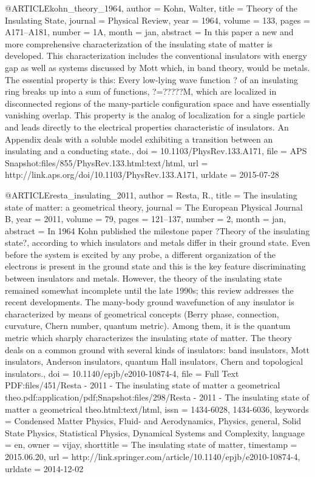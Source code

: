@ARTICLE{kohn_theory_1964,
  author = {Kohn, Walter},
  title = {Theory of the {Insulating} {State}},
  journal = {Physical Review},
  year = {1964},
  volume = {133},
  pages = {A171--A181},
  number = {1A},
  month = jan,
  abstract = {In this paper a new and more comprehensive characterization of the
	insulating state of matter is developed. This characterization includes
	the conventional insulators with energy gap as well as systems discussed
	by Mott which, in band theory, would be metals. The essential property
	is this: Every low-lying wave function ? of an insulating ring breaks
	up into a sum of functions, ?=?????M, which are localized in disconnected
	regions of the many-particle configuration space and have essentially
	vanishing overlap. This property is the analog of localization for
	a single particle and leads directly to the electrical properties
	characteristic of insulators. An Appendix deals with a soluble model
	exhibiting a transition between an insulating and a conducting state.},
  doi = {10.1103/PhysRev.133.A171},
  file = {APS Snapshot:files/855/PhysRev.133.html:text/html},
  url = {http://link.aps.org/doi/10.1103/PhysRev.133.A171},
  urldate = {2015-07-28}
}

@ARTICLE{resta_insulating_2011,
  author = {Resta, R.},
  title = {The insulating state of matter: a geometrical theory},
  journal = {The European Physical Journal B},
  year = {2011},
  volume = {79},
  pages = {121--137},
  number = {2},
  month = jan,
  abstract = {In 1964 Kohn published the milestone paper ?Theory of the insulating
	state?, according to which insulators and metals differ in their
	ground state. Even before the system is excited by any probe, a different
	organization of the electrons is present in the ground state and
	this is the key feature discriminating between insulators and metals.
	However, the theory of the insulating state remained somewhat incomplete
	until the late 1990s; this review addresses the recent developments.
	The many-body ground wavefunction of any insulator is characterized
	by means of geometrical concepts (Berry phase, connection, curvature,
	Chern number, quantum metric). Among them, it is the quantum metric
	which sharply characterizes the insulating state of matter. The theory
	deals on a common ground with several kinds of insulators: band insulators,
	Mott insulators, Anderson insulators, quantum Hall insulators, Chern
	and topological insulators.},
  doi = {10.1140/epjb/e2010-10874-4},
  file = {Full Text PDF:files/451/Resta - 2011 - The insulating state of matter a geometrical theo.pdf:application/pdf;Snapshot:files/298/Resta - 2011 - The insulating state of matter a geometrical theo.html:text/html},
  issn = {1434-6028, 1434-6036},
  keywords = {Condensed Matter Physics, Fluid- and Aerodynamics, Physics, general,
	Solid State Physics, Statistical Physics, Dynamical Systems and Complexity},
  language = {en},
  owner = {vijay},
  shorttitle = {The insulating state of matter},
  timestamp = {2015.06.20},
  url = {http://link.springer.com/article/10.1140/epjb/e2010-10874-4},
  urldate = {2014-12-02}
}

